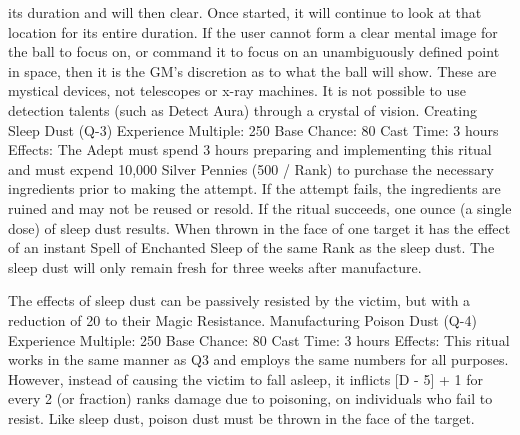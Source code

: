 \documentclass[a4paper]{article}
\begin{document}
\begin{multicols}{3}
its duration and will then clear. Once started, it will
continue to look at that location for its entire duration. If the user cannot form a clear mental image
for the ball to focus on, or command it to focus on
an unambiguously defined point in space, then it is
the GM’s discretion as to what the ball will show.
These are mystical devices, not telescopes or x-ray
machines. It is not possible to use detection talents
(such as Detect Aura) through a crystal of vision.
Creating Sleep Dust (Q-3)
Experience Multiple: 250
Base Chance: 80%
Cast Time: 3 hours
Effects: The Adept must spend 3 hours preparing
and implementing this ritual and must expend
10,000 Silver Pennies (500 / Rank) to purchase the
necessary ingredients prior to making the attempt.
If the attempt fails, the ingredients are ruined and
may not be reused or resold. If the ritual succeeds,
one ounce (a single dose) of sleep dust results.
When thrown in the face of one target it has the
effect of an instant Spell of Enchanted Sleep of the
same Rank as the sleep dust. The sleep dust will
only remain fresh for three weeks after manufacture.

The effects of sleep dust can be passively resisted
by the victim, but with a reduction of 20 to their
Magic Resistance.
Manufacturing Poison Dust (Q-4)
Experience Multiple: 250
Base Chance: 80%
Cast Time: 3 hours
Effects: This ritual works in the same manner as Q3 and employs the same numbers for all purposes.
However, instead of causing the victim to fall
asleep, it inflicts [D - 5] + 1 for every 2 (or fraction) ranks damage due to poisoning, on individuals who fail to resist. Like sleep dust, poison dust
must be thrown in the face of the target.


\end{multicols}
\end{document}
